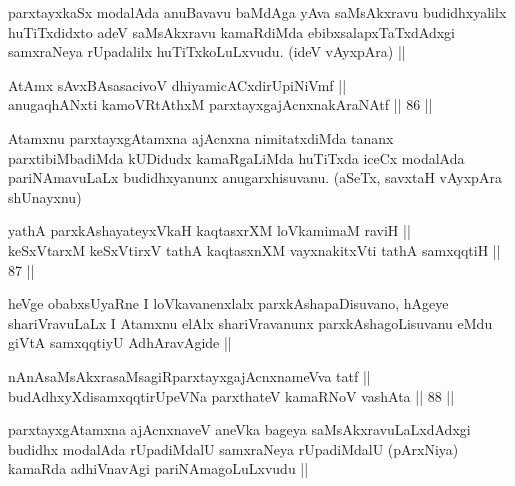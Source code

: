 \begin{artha}
parxtayxkaSx modalAda anuBavavu baMdAga yAva saMsAkxravu budidhxyalilx huTiTxdidxto adeV saMsAkxravu kamaRdiMda ebibxsalapxTaTxdAdxgi samxraNeya rUpadalilx huTiTxkoLuLxvudu. (ideV vAyxpAra) ||
\end{artha}


\begin{shl}
AtAmx sAvxBAsasacivoV dhiyamicACxdirUpiNiVmf || \\
anugaqhANxti kamoVRtAthxM parxtayxgajAcnxnakAraNAtf ||  86 ||  
\end{shl}

\begin{artha}
Atamxnu parxtayxgAtamxna ajAcnxna nimitatxdiMda tananx parxtibiMbadiMda kUDidudx kamaRgaLiMda huTiTxda iceCx modalAda pariNAmavuLaLx budidhxyanunx anugarxhisuvanu. (aSeTx, savxtaH vAyxpAra shUnayxnu)
\end{artha}


\begin{shl}
yathA parxkAshayateyxVkaH kaqtasxrXM loVkamimaM raviH || \\
keSxVtarxM keSxVtirxV tathA kaqtasxnXM vayxnakitxVti tathA samxqqtiH ||  87 ||  
\end{shl}

\begin{artha}
heVge obabxsUyaRne I loVkavanenxlalx parxkAshapaDisuvano, hAgeye shariVravuLaLx I Atamxnu elAlx shariVravanunx parxkAshagoLisuvanu eMdu giVtA samxqqtiyU AdhAravAgide ||
\end{artha}


\begin{shl}
nAnAsaMsAkxrasaMsagiRparxtayxgajAcnxnameVva tatf || \\
budAdhxyXdisamxqqtirUpeVNa parxthateV kamaRNoV vashAta ||  88 || 
\end{shl}

\begin{artha}
parxtayxgAtamxna ajAcnxnaveV aneVka bageya saMsAkxravuLaLxdAdxgi budidhx modalAda rUpadiMdalU samxraNeya rUpadiMdalU (pArxNiya) kamaRda adhiVnavAgi pariNAmagoLuLxvudu ||
\end{artha}

